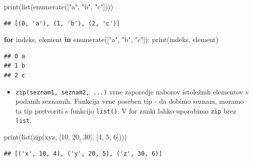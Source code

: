\documentclass[
]{report}
\newenvironment{Shaded}{\begin{snugshade}}{\end{snugshade}}
\newcommand{\BuiltInTok}[1]{#1}
\newcommand{\ControlFlowTok}[1]{\textcolor[rgb]{0.13,0.29,0.53}{\textbf{#1}}}
\newcommand{\DecValTok}[1]{\textcolor[rgb]{0.00,0.00,0.81}{#1}}
\newcommand{\KeywordTok}[1]{\textcolor[rgb]{0.13,0.29,0.53}{\textbf{#1}}}
\newcommand{\NormalTok}[1]{#1}
\newcommand{\StringTok}[1]{\textcolor[rgb]{0.31,0.60,0.02}{#1}}
\providecommand{\tightlist}{%
  \setlength{\itemsep}{0pt}\setlength{\parskip}{0pt}}
\begin{document}
\begin{Shaded}
\begin{Highlighting}[]
\BuiltInTok{print}\NormalTok{(}\BuiltInTok{list}\NormalTok{(}\BuiltInTok{enumerate}\NormalTok{([}\StringTok{"a"}\NormalTok{, }\StringTok{"b"}\NormalTok{, }\StringTok{"c"}\NormalTok{])))}
\end{Highlighting}
\end{Shaded}

\begin{verbatim}
## [(0, 'a'), (1, 'b'), (2, 'c')]
\end{verbatim}

\begin{Shaded}
\begin{Highlighting}[]
\ControlFlowTok{for}\NormalTok{ indeks, element }\KeywordTok{in} \BuiltInTok{enumerate}\NormalTok{([}\StringTok{"a"}\NormalTok{, }\StringTok{"b"}\NormalTok{, }\StringTok{"c"}\NormalTok{]):}
    \BuiltInTok{print}\NormalTok{(indeks, element)}
\end{Highlighting}
\end{Shaded}

\begin{verbatim}
## 0 a
## 1 b
## 2 c
\end{verbatim}

\begin{itemize}
\tightlist
\item
  \texttt{zip(seznam1,\ seznam2,\ ...)} vrne zaporedje naborov istoležnih elementov v podanih seznamih. Funkcija
  vrne poseben tip - da dobimo seznam, moramo ta tip pretvoriti s funkcijo \texttt{list()}.
  V for zanki lahko uporabimo \texttt{zip} brez \texttt{list}.
\end{itemize}

\begin{Shaded}
\begin{Highlighting}[]
\BuiltInTok{print}\NormalTok{(}\BuiltInTok{list}\NormalTok{(}\BuiltInTok{zip}\NormalTok{(}\StringTok{\textquotesingle{}xyz\textquotesingle{}}\NormalTok{, [}\DecValTok{10}\NormalTok{, }\DecValTok{20}\NormalTok{, }\DecValTok{30}\NormalTok{], [}\DecValTok{4}\NormalTok{, }\DecValTok{5}\NormalTok{, }\DecValTok{6}\NormalTok{])))}
\end{Highlighting}
\end{Shaded}

\begin{verbatim}
## [('x', 10, 4), ('y', 20, 5), ('z', 30, 6)]
\end{verbatim}
\end{document}
